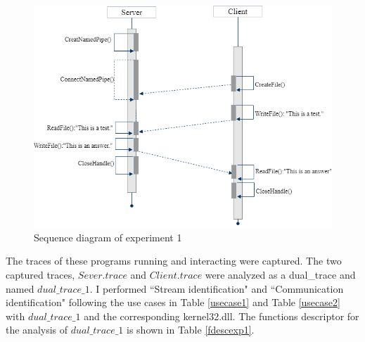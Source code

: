 \documentclass[12pt,oneside]{book}
\begin{document}
\begin{figure}[H]
\centerline{\includegraphics[scale=0.6]{Figures/exp1}}
 \caption{Sequence diagram of experiment 1}
\label{exp1}
\end{figure}

The traces of these programs running and interacting were captured. The two captured traces, $Sever.trace$ and $Client.trace$ were analyzed as a dual\_trace and named $dual\_trace\_1$. I performed ``Stream identification" and ``Communication identification" following the use cases in Table \ref{usecase1} and Table \ref{usecase2} with $dual\_trace\_1$ and the corresponding kernel32.dll. The functions descriptor for the analysis of $dual\_trace\_1$ is shown in Table \ref{fdescexp1}.
\end{document}
